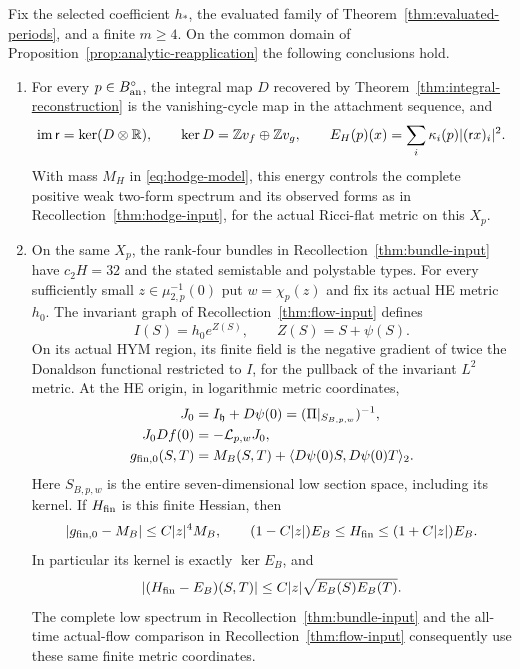 \begin{theorem}
\label{thm:integrated}
Fix the selected coefficient $h_*$, the evaluated family
of Theorem~\ref{thm:evaluated-periods}, and a finite $m\ge4$.
On the common domain of Proposition~\ref{prop:analytic-reapplication}
the following conclusions hold.

\begin{enumerate}
\item For every $p\in B_{\rm an}^{\circ}$, the integral map $D$
recovered by Theorem~\ref{thm:integral-reconstruction} is the
vanishing-cycle map in the attachment sequence, and
\begin{equation}\label{eq:attachment-hodge-identity}
 \operatorname{im}\mathsf r=\ker(D\otimes\mathbb R),\qquad
 \ker D=\mathbb Z v_f\oplus\mathbb Z v_g,\qquad
 E_H(p)(x)=\sum_i\kappa_i(p)|(\mathsf r x)_i|^2.
\end{equation}
With mass $M_H$ in \eqref{eq:hodge-model}, this energy controls
the complete positive weak two-form spectrum and its observed
forms as in Recollection~\ref{thm:hodge-input}, for the actual
Ricci-flat metric on this $X_p$.

\item On the same $X_p$, the rank-four bundles in
Recollection~\ref{thm:bundle-input} have $c_2H=32$ and the stated
semistable and polystable types. For every sufficiently small
$z\in\mu_{2,p}^{-1}(0)$ put $w=\chi_p(z)$ and fix its actual
HE metric $h_0$. The invariant graph of
Recollection~\ref{thm:flow-input} defines
\[
 I(S)=h_0e^{Z(S)},\qquad Z(S)=S+\psi(S).
\]
On its actual HYM region, its finite field is the negative
gradient of twice the Donaldson functional restricted to $I$,
for the pullback of the invariant $L^2$ metric. At the HE origin,
in logarithmic metric coordinates,
\begin{equation}\label{eq:exact-spectral-flow}
 \begin{split}
 J_0&=I_{\mathfrak h}+D\psi(0)
                  =(\Pi|_{S_{B,p,w}})^{-1},\\
 J_0Df(0)&=-\mathcal L_{p,w}J_0,\\
 g_{{\rm fin},0}(S,T)
      &=M_B(S,T)+\langle D\psi(0)S,D\psi(0)T\rangle_2 .
 \end{split}
\end{equation}
Here $S_{B,p,w}$ is the entire seven-dimensional low section
space, including its kernel. If $H_{\rm fin}$ is this finite
Hessian, then
\begin{equation}\label{eq:integrated-flow-hessian}
 |g_{{\rm fin},0}-M_B|\le C|z|^4M_B,\qquad
 (1-C|z|)E_B\le H_{\rm fin}\le(1+C|z|)E_B.
\end{equation}
In particular its kernel is exactly $\ker E_B$, and
\[
 |(H_{\rm fin}-E_B)(S,T)|
       \le C|z|\sqrt{E_B(S)E_B(T)}.
\]
The complete low spectrum in Recollection~\ref{thm:bundle-input}
and the all-time actual-flow comparison in
Recollection~\ref{thm:flow-input} consequently use these same
finite metric coordinates.


\end{enumerate}
\end{theorem}
